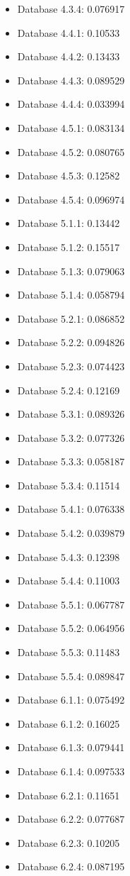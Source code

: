 \begin{itemize}
\item Database 4.3.4: 0.076917
\item Database 4.4.1: 0.10533
\item Database 4.4.2: 0.13433
\item Database 4.4.3: 0.089529
\item Database 4.4.4: 0.033994
\item Database 4.5.1: 0.083134
\item Database 4.5.2: 0.080765
\item Database 4.5.3: 0.12582
\item Database 4.5.4: 0.096974
\item Database 5.1.1: 0.13442
\item Database 5.1.2: 0.15517
\item Database 5.1.3: 0.079063
\item Database 5.1.4: 0.058794
\item Database 5.2.1: 0.086852
\item Database 5.2.2: 0.094826
\item Database 5.2.3: 0.074423
\item Database 5.2.4: 0.12169
\item Database 5.3.1: 0.089326
\item Database 5.3.2: 0.077326
\item Database 5.3.3: 0.058187
\item Database 5.3.4: 0.11514
\item Database 5.4.1: 0.076338
\item Database 5.4.2: 0.039879
\item Database 5.4.3: 0.12398
\item Database 5.4.4: 0.11003
\item Database 5.5.1: 0.067787
\item Database 5.5.2: 0.064956
\item Database 5.5.3: 0.11483
\item Database 5.5.4: 0.089847
\item Database 6.1.1: 0.075492
\item Database 6.1.2: 0.16025
\item Database 6.1.3: 0.079441
\item Database 6.1.4: 0.097533
\item Database 6.2.1: 0.11651
\item Database 6.2.2: 0.077687
\item Database 6.2.3: 0.10205
\item Database 6.2.4: 0.087195

\end{itemize}

